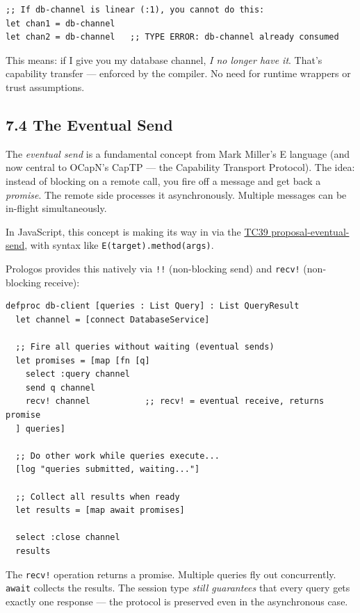 \documentclass[11pt]{article}
\begin{document}
\begin{verbatim}
;; If db-channel is linear (:1), you cannot do this:
let chan1 = db-channel
let chan2 = db-channel   ;; TYPE ERROR: db-channel already consumed
\end{verbatim}

This means: if I give you my database channel, \emph{I no longer have it}.
That's capability transfer --- enforced by the compiler. No need for
runtime wrappers or trust assumptions.
\subsection{7.4 The Eventual Send}
\label{sec:org834cbb1}

The \emph{eventual send} is a fundamental concept from Mark Miller's E
language (and now central to OCapN's CapTP --- the Capability Transport
Protocol). The idea: instead of blocking on a remote call, you fire off
a message and get back a \emph{promise}. The remote side processes it
asynchronously. Multiple messages can be in-flight simultaneously.

In JavaScript, this concept is making its way in via the \href{https://github.com/tc39/proposal-eventual-send}{TC39
proposal-eventual-send}, with syntax like \texttt{E(target).method(args)}.

Prologos provides this natively via \texttt{!!} (non-blocking send) and
\texttt{recv!} (non-blocking receive):

\begin{verbatim}
defproc db-client [queries : List Query] : List QueryResult
  let channel = [connect DatabaseService]

  ;; Fire all queries without waiting (eventual sends)
  let promises = [map [fn [q]
    select :query channel
    send q channel
    recv! channel           ;; recv! = eventual receive, returns promise
  ] queries]

  ;; Do other work while queries execute...
  [log "queries submitted, waiting..."]

  ;; Collect all results when ready
  let results = [map await promises]

  select :close channel
  results
\end{verbatim}

The \texttt{recv!} operation returns a promise. Multiple queries fly out
concurrently. \texttt{await} collects the results. The session type \emph{still
guarantees} that every query gets exactly one response --- the protocol
is preserved even in the asynchronous case.
\end{document}
